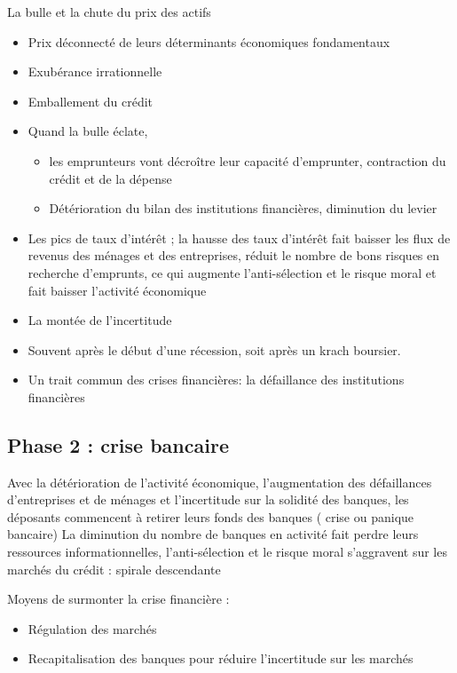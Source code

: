 	La bulle et la chute du prix des actifs 
	
	\begin{itemize}
		\item Prix déconnecté de leurs déterminants économiques fondamentaux 
		\item Exubérance irrationnelle 
		\item Emballement du crédit 
		\item Quand la bulle éclate, 
		\begin{itemize}
			\item les emprunteurs vont décroître leur capacité d'emprunter, contraction du crédit et de la dépense 
			\item Détérioration du bilan des institutions financières, diminution du levier
		\end{itemize}
		\item Les pics de taux d'intérêt ; la hausse des taux d'intérêt fait baisser les flux de revenus des 
ménages et des entreprises, réduit le nombre de bons risques en 
recherche d'emprunts, ce qui augmente l'anti-sélection et le risque 
moral et fait baisser l'activité économique
		\item La montée de l'incertitude 
		\item Souvent après le début d'une récession, soit après un krach boursier. 
		\item Un trait commun des crises financières: la défaillance des institutions financières
	\end{itemize}

	\subsection{Phase 2 : crise bancaire}
	
	Avec la détérioration de l'activité économique, l'augmentation des 
défaillances d'entreprises et de ménages et l'incertitude sur la solidité des 
banques, les déposants commencent à retirer leurs fonds des banques ( crise 
ou panique bancaire) 
La diminution du nombre de banques en activité fait perdre leurs 
ressources informationnelles, l'anti-sélection et le risque moral s'aggravent sur les marchés du crédit : spirale descendante


	Moyens de surmonter la crise financière :
	\begin{itemize}
		\item Régulation des marchés
		\item Recapitalisation des banques pour réduire l'incertitude sur les marchés
	\end{itemize}

